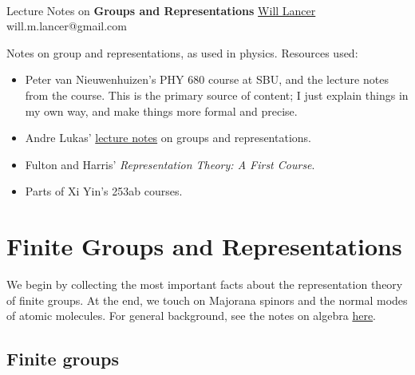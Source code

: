 \documentclass[11pt]{article}
\begin{document}
\thispagestyle{empty}
\bigskip \
\vspace{0.1cm}

\begin{center}
{\fontsize{22}{22} \selectfont Lecture Notes on}
\vskip 16pt
{\fontsize{36}{36} \selectfont \bf \sffamily Groups and Representations}
\vskip 24pt
{\fontsize{18}{18} \selectfont \rmfamily \href{https://will-lancer.github.io}{Will Lancer}} 
\vskip 6pt
{\fontsize{14}{14} \selectfont \ttfamily will.m.lancer@gmail.com} 
\vskip 24pt
\end{center}

{\parindent0pt \baselineskip=15.5pt}
\noin
Notes on group and representations, as used in physics. Resources used:
\begin{itemize}
    \item Peter van Nieuwenhuizen's PHY 680 course at SBU,
    and the lecture notes from the course. This is the primary
    source of content; I just explain things in my own way, and
    make things more formal and precise.
    \item Andre Lukas' 
    \href{https://www-thphys.physics.ox.ac.uk/people/AndreLukas/GroupsandRepresentations/groupsrepslecturenotes.pdf}{lecture notes} 
    on groups and representations.
    \item Fulton and Harris' \emph{Representation Theory: A First Course}.
    \item Parts of Xi Yin's 253ab courses.
\end{itemize}
\newpage
\microtoc
\newpage


\section{Finite Groups and Representations}

We begin by collecting the most important facts about the representation
theory of finite groups. At the end, we touch on Majorana spinors and the normal
modes of atomic molecules. For general background, see the notes on
algebra \href{https://github.com/will-lancer/notes/blob/main/Mathematics/Algebra/Algebra.pdf}{here}.

\subsection{Finite groups}
\end{document}
